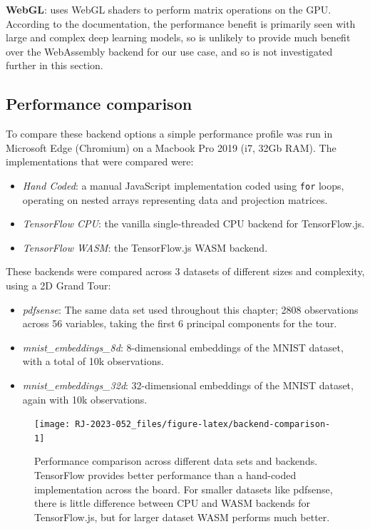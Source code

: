 \textbf{WebGL}: uses WebGL shaders to perform matrix operations on the GPU. According to the documentation, the performance benefit is primarily seen with large and complex deep learning models, so is unlikely to provide much benefit over the WebAssembly backend for our use case, and so is not investigated further in this section.

\hypertarget{performance-comparison}{%
\subsection{Performance comparison}\label{performance-comparison}}

To compare these backend options a simple performance profile was run in Microsoft Edge (Chromium) on a Macbook Pro 2019 (i7, 32Gb RAM). The implementations that were compared were:

\begin{itemize}
\tightlist
\item
  \emph{Hand Coded}: a manual JavaScript implementation coded using \texttt{for} loops, operating on nested arrays representing data and projection matrices.
\item
  \emph{TensorFlow CPU}: the vanilla single-threaded CPU backend for TensorFlow.js.
\item
  \emph{TensorFlow WASM}: the TensorFlow.js WASM backend.
\end{itemize}

These backends were compared across 3 datasets of different sizes and complexity, using a 2D Grand Tour:

\begin{itemize}
\tightlist
\item
  \emph{pdfsense}: The same data set used throughout this chapter; 2808 observations across 56 variables, taking the first 6 principal components for the tour.
\item
  \emph{mnist\_embeddings\_8d}: 8-dimensional embeddings of the MNIST dataset, with a total of 10k observations.
\item
  \emph{mnist\_embeddings\_32d}: 32-dimensional embeddings of the MNIST dataset, again with 10k observations.
\end{itemize}

\begin{figure}

{\centering \texttt{[image: RJ-2023-052\_files/figure-latex/backend-comparison-1]} 

}

\caption{Performance comparison across different data sets and backends. TensorFlow provides better performance than a hand-coded implementation across the board. For smaller datasets like pdfsense, there is little difference between CPU and WASM backends for TensorFlow.js, but for larger dataset WASM performs much better.}\label{fig:backend-comparison}
\end{figure}

